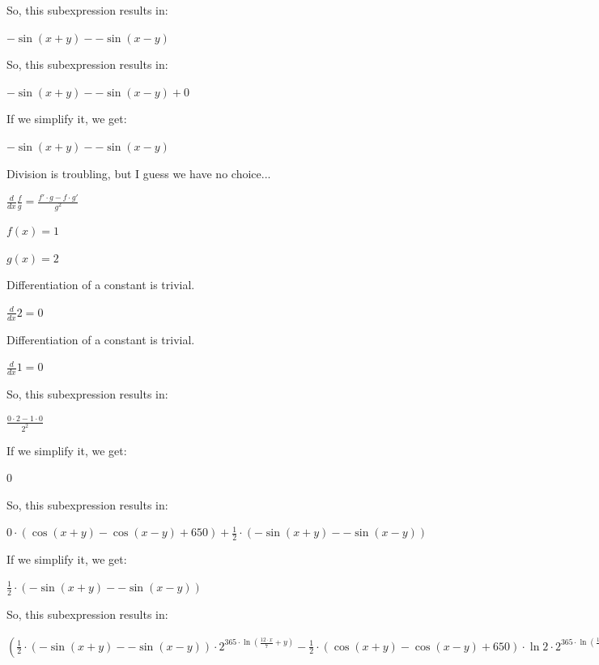 \documentclass[12pt]{article}
\begin{document}
\begin{fleqn}[\parindent]
So, this subexpression results in:\par
$ - \sin ( x  +  y ) - - \sin ( x  -  y ) $\par
So, this subexpression results in:\par
$ - \sin ( x  +  y ) - - \sin ( x  -  y ) +  0  $\par
If we simplify it, we get:\par
$ - \sin ( x  +  y ) - - \sin ( x  -  y ) $\par
Division is troubling, but I guess we have no choice...\par
$ \frac{d}{dx} \frac{f}{g} = \frac{f' \cdot g - f \cdot g'}{g^2} $\par
$ f(x) =  1  $\par
$ g(x) =  2  $\par
Differentiation of a constant is trivial.\par
$ \frac{d}{dx} 2 = 0 $\par
Differentiation of a constant is trivial.\par
$ \frac{d}{dx} 1 = 0 $\par
So, this subexpression results in:\par
$ \frac{ 0  \cdot  2  -  1  \cdot  0 }{{ 2 }^{ 2 }} $\par
If we simplify it, we get:\par
$  0  $\par
So, this subexpression results in:\par
$  0  \cdot (\cos ( x  +  y ) - \cos ( x  -  y ) +  650 ) + \frac{ 1 }{ 2 } \cdot (- \sin ( x  +  y ) - - \sin ( x  -  y )) $\par
If we simplify it, we get:\par
$ \frac{ 1 }{ 2 } \cdot (- \sin ( x  +  y ) - - \sin ( x  -  y )) $\par
So, this subexpression results in:\par
$ (\frac{ 1 }{ 2 } \cdot (- \sin ( x  +  y ) - - \sin ( x  -  y )) \cdot { 2 }^{ 365  \cdot \ln (\frac{ 12  \cdot  x }{ 7 } +  y )} - \frac{ 1 }{ 2 } \cdot (\cos ( x  +  y ) - \cos ( x  -  y ) +  650 ) \cdot \ln  2  \cdot { 2 }^{ 365  \cdot \ln (\frac{ 12  \cdot  x }{ 7 } +  y )} \cdot  365  \cdot \frac{\frac{ 84 }{ 49 }}{\frac{ 12  \cdot  x }{ 7 } +  y }) \div {({ 2 }^{ 365  \cdot \ln (\frac{ 12  \cdot  x }{ 7 } +  y )})}^{ 2 } $\par

\end{fleqn}
\end{document}
